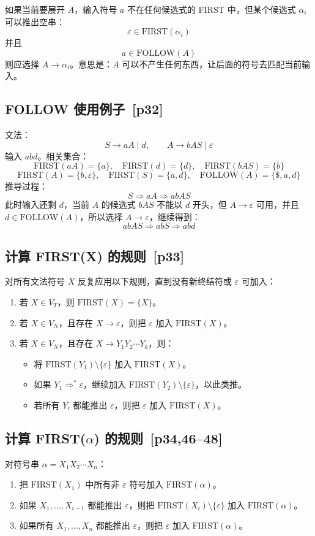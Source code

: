 \documentclass[UTF8,fontset=none,11pt]{ctexart}
\newcommand{\pg}[1]{\texorpdfstring{{\small\color{graytext}\,[p#1]}}{ [p#1]}}
\newcommand{\eps}{\varepsilon}
\begin{document}
如果当前要展开 \(A\)，输入符号 \(a\) 不在任何候选式的 FIRST 中，但某个候选式 \(\alpha_i\) 可以推出空串：
\[
\eps\in\mathrm{FIRST}(\alpha_i)
\]
并且
\[
a\in\mathrm{FOLLOW}(A)
\]
则应选择 \(A\to\alpha_i\)。意思是：\(A\) 可以不产生任何东西，让后面的符号去匹配当前输入。

\subsection{FOLLOW 使用例子 \pg{32}}
文法：
\[
S\to aA\mid d,\qquad A\to bAS\mid\eps
\]
输入 \(abd\)。相关集合：
\[
\mathrm{FIRST}(aA)=\{a\},\quad
\mathrm{FIRST}(d)=\{d\},\quad
\mathrm{FIRST}(bAS)=\{b\}
\]
\[
\mathrm{FIRST}(A)=\{b,\eps\},\quad
\mathrm{FIRST}(S)=\{a,d\},\quad
\mathrm{FOLLOW}(A)=\{\$,a,d\}
\]
推导过程：
\[
S\Rightarrow aA\Rightarrow abAS
\]
此时输入还剩 \(d\)，当前 \(A\) 的候选式 \(bAS\) 不能以 \(d\) 开头，但 \(A\to\eps\) 可用，并且 \(d\in\mathrm{FOLLOW}(A)\)，所以选择 \(A\to\eps\)，继续得到：
\[
abAS\Rightarrow abS\Rightarrow abd
\]

\subsection{计算 FIRST(X) 的规则 \pg{33}}
对所有文法符号 \(X\) 反复应用以下规则，直到没有新终结符或 \(\eps\) 可加入：
\begin{enumerate}
  \item 若 \(X\in V_T\)，则 \(\mathrm{FIRST}(X)=\{X\}\)。
  \item 若 \(X\in V_N\)，且存在 \(X\to\eps\)，则把 \(\eps\) 加入 \(\mathrm{FIRST}(X)\)。
  \item 若 \(X\in V_N\)，且存在 \(X\to Y_1Y_2\cdots Y_k\)，则：
  \begin{itemize}
    \item 将 \(\mathrm{FIRST}(Y_1)\setminus\{\eps\}\) 加入 \(\mathrm{FIRST}(X)\)。
    \item 如果 \(Y_1\Rightarrow^*\eps\)，继续加入 \(\mathrm{FIRST}(Y_2)\setminus\{\eps\}\)，以此类推。
    \item 若所有 \(Y_i\) 都能推出 \(\eps\)，则把 \(\eps\) 加入 \(\mathrm{FIRST}(X)\)。
  \end{itemize}
\end{enumerate}

\subsection[计算 FIRST(alpha) 的规则]{计算 FIRST(\(\alpha\)) 的规则 \pg{34,46--48}}
对符号串 \(\alpha=X_1X_2\cdots X_n\)：
\begin{enumerate}
  \item 把 \(\mathrm{FIRST}(X_1)\) 中所有非 \(\eps\) 符号加入 \(\mathrm{FIRST}(\alpha)\)。
  \item 如果 \(X_1,\ldots,X_{i-1}\) 都能推出 \(\eps\)，则把 \(\mathrm{FIRST}(X_i)\setminus\{\eps\}\) 加入 \(\mathrm{FIRST}(\alpha)\)。
  \item 如果所有 \(X_1,\ldots,X_n\) 都能推出 \(\eps\)，则把 \(\eps\) 加入 \(\mathrm{FIRST}(\alpha)\)。
\end{enumerate}
\end{document}
